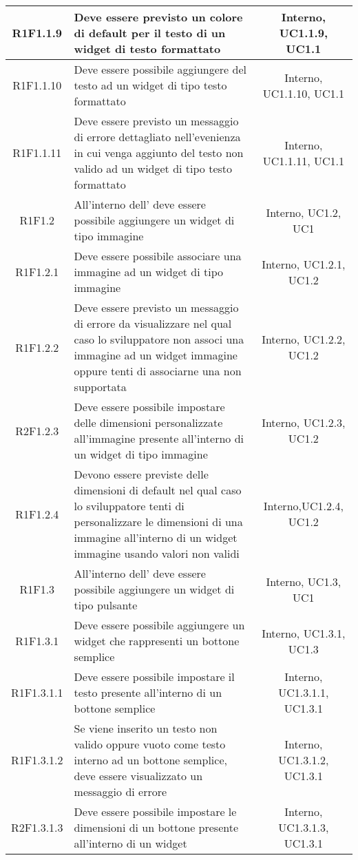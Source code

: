\begin{longtable}{|c|>{\centering}m{7cm}|c|}
			\hline
			R1F1.1.9 & Deve essere previsto un colore di default per il testo di un widget di testo formattato & Interno, UC1.1.9, UC1.1 \\
			\hline
			R1F1.1.10 & Deve essere possibile aggiungere del testo ad un widget di tipo testo formattato & Interno, UC1.1.10, UC1.1 \\
			\hline
			R1F1.1.11 & Deve essere previsto un messaggio di errore dettagliato nell'evenienza in cui venga aggiunto del testo non valido ad un widget di tipo testo formattato & Interno, UC1.1.11, UC1.1 \\
			\hline
			R1F1.2 & All'interno dell'\termine{SDK} deve essere possibile aggiungere un widget di tipo immagine & Interno, UC1.2, UC1 \\ 
			\hline
			R1F1.2.1 & Deve essere possibile associare una immagine ad un widget di tipo immagine & Interno, UC1.2.1, UC1.2 \\
		\hline
		R1F1.2.2 & Deve essere previsto un messaggio di errore da visualizzare nel qual caso lo sviluppatore non associ una immagine ad un widget immagine oppure tenti di associarne una non supportata & Interno, UC1.2.2, UC1.2 \\
		\hline
		R2F1.2.3 & Deve essere possibile impostare delle dimensioni personalizzate all'immagine presente all'interno di un widget di tipo immagine & Interno, UC1.2.3, UC1.2 \\
		\hline
		R1F1.2.4 & Devono essere previste delle dimensioni di default nel qual caso lo sviluppatore tenti di personalizzare le dimensioni di una immagine all'interno di un widget immagine usando valori non validi & Interno,UC1.2.4, UC1.2 \\
			\hline
			R1F1.3 & All'interno dell'\termine{SDK} deve essere possibile aggiungere un widget di tipo pulsante & Interno, UC1.3, UC1 \\ 
			\hline
			R1F1.3.1 & Deve essere possibile aggiungere un widget che rappresenti un bottone semplice & Interno, UC1.3.1, UC1.3 \\
			\hline
			R1F1.3.1.1 & Deve essere possibile impostare il testo presente all'interno di un bottone semplice & Interno, UC1.3.1.1, UC1.3.1 \\
			\hline
			R1F1.3.1.2 & Se viene inserito un testo non valido oppure vuoto come testo interno ad un bottone semplice, deve essere visualizzato un messaggio di errore & Interno, UC1.3.1.2, UC1.3.1 \\
			\hline
			R2F1.3.1.3 & Deve essere possibile impostare le dimensioni di un bottone presente all'interno di un widget & Interno, UC1.3.1.3, UC1.3.1 \\

\end{longtable}
